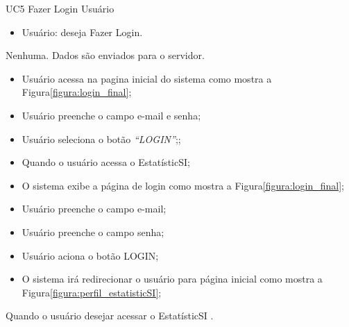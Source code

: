 \casoDeUso
{UC5}
{Fazer Login}
{Usuário}
{
\begin{itemize}
	\item Usuário: deseja Fazer Login.	
\end{itemize}

}
{Nenhuma.}
{Dados são enviados para o servidor.}
{
\begin{itemize}
	\item Usuário acessa na pagina inicial do sistema como mostra a Figura\ref{figura:login_final}; 
	\item Usuário preenche o campo  e-mail e senha;
	\item Usuário seleciona o botão    	  \textit{“LOGIN”};;
\end{itemize}
}
{
\begin{itemize}

	\item Quando o usuário acessa o EstatísticSI;
	\item O sistema exibe a página de login como mostra a Figura\ref{figura:login_final};
	\item Usuário preenche o campo  e-mail;
	\item Usuário preenche o campo senha;
	\item Usuário aciona o botão LOGIN;
	\item O sistema irá redirecionar o usuário para página inicial como mostra a Figura\ref{figura:perfil_estatisticSI};
	
\end{itemize}
}
{Quando o usuário desejar acessar o EstatísticSI .}
{

}

